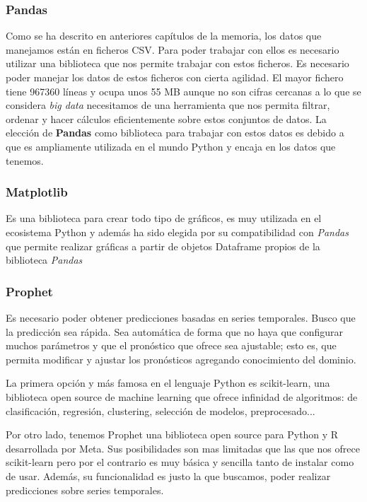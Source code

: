 \subsubsection{Pandas}
Como se ha descrito en anteriores capítulos de la memoria, los datos que manejamos están
en ficheros CSV. Para poder trabajar con ellos es necesario utilizar una biblioteca que
nos permite trabajar con estos ficheros. Es necesario poder manejar los datos de estos
ficheros con cierta agilidad. El mayor fichero tiene 967360 líneas y ocupa unos 55 MB
aunque no son cifras cercanas a lo que se considera \textit{big data} necesitamos de una
herramienta que nos permita filtrar, ordenar y hacer cálculos eficientemente sobre estos
conjuntos de datos. La elección de \textbf{Pandas} como biblioteca para trabajar con estos
datos es debido a que es ampliamente utilizada en el mundo Python y encaja en los datos
que tenemos.

\subsubsection{Matplotlib}
Es una biblioteca para crear todo tipo de gráficos, es muy utilizada en el ecosistema
Python y además ha sido elegida por su compatibilidad con \textit{Pandas} que permite
realizar gráficas a partir de objetos Dataframe propios de la biblioteca \textit{Pandas}

\subsubsection{Prophet}
Es necesario poder obtener predicciones basadas en series temporales. Busco que la
predicción sea rápida. Sea automática de forma que no haya que configurar muchos
parámetros y que el pronóstico que ofrece sea ajustable; esto es, que permita modificar y
ajustar los pronósticos agregando conocimiento del dominio.

La primera opción y más famosa en el lenguaje Python es scikit-learn, una biblioteca open
source de machine learning que ofrece infinidad de algoritmos: de clasificación,
regresión, clustering, selección de modelos, preprocesado...

Por otro lado, tenemos Prophet una biblioteca open source para Python y R desarrollada por
Meta. Sus posibilidades son mas limitadas que las que nos ofrece scikit-learn pero por el
contrario es muy básica y sencilla tanto de instalar como de usar. Además, su
funcionalidad es justo la que buscamos, poder realizar predicciones sobre series
temporales.

